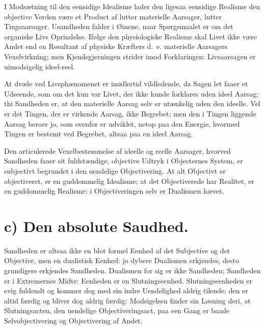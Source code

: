 \documentclass[12pt]{book}
\newcommand{\opage}[1]{\marginnote{\footnotesize\textit{[#1]}}}
\begin{document}
I Modsætning til den eensidige Idealisme lader den ligesaa eensidige
Realisme den objective Verden være et Product af lutter materielle
Aarsager, lutter Tingsaarsager. Usandheden falder i Øinene, naar
Spørgsmaalet er om det organiske Livs Oprindelse. Ifølge den
physiologiske Realisme skal Livet ikke være Andet end en Resultant
af physiske Kræfters d.~e. materielle Aarsagers Vexelvirkning; men
Kjendsgjerningen strider imod Forklaringen: Livsaarsagen er
uimodsigelig ideel-reel.

At dvæle ved Livsphænomenet er imidlertid vildledende, da Sagen let
faaer et Udseende, som om det kun var Livet, der ikke kunde
forklares uden ideel Aarsag; thi Sandheden er, at den materielle
Aarsag selv er utænkelig uden den ideelle. Vel er det Tingen, der er
virkende Aarsag, ikke Begrebet; men den i Tingen liggende Aarsag
beroer jo, som ovenfor er udviklet, netop paa den Energie, hvormed
Tingen er bestemt ved Begrebet, altsaa paa en ideel Aarsag.

Den articulerede Vexelbestemmelse af ideelle og reelle Aarsager,
hvorved Sandheden faaer sit fuldstændige, objective Udtryk i
Objecternes System, er subjectivt begrundet i den uendelige
Objectivering. At alt Objectivt er objectiveret, er en guddommelig
Idealisme; at det Objectiverede har Realitet, er en guddommelig
Realisme: i Objectiveringen selv er Dualismen hævet.
\opage{77} \section*{c) Den absolute Saudhed.}

Sandheden er altsaa ikke en blot formel Eenhed af det Subjective og
det Objective, men en dualistisk Eenhed: jo dybere Dualismen
erkjendes, desto grundigere erkjendes Sandheden. Dualismen for sig
er ikke Sandheden; Sandheden er i Extremernes Midte: Eenheden er en
Slutningseenhed. Slutningseenheden er evig fuldendt og kommer dog
med sin indre Uendelighed aldrig tilende; den er altid færdig og
bliver dog aldrig færdig: Modsigelsen finder sin Løsning deri, at
Slutningsacten, den uendelige Objectiveringsact, paa een Gang er
baade Selvobjectivering og Objectivering af Andet.
\end{document}
